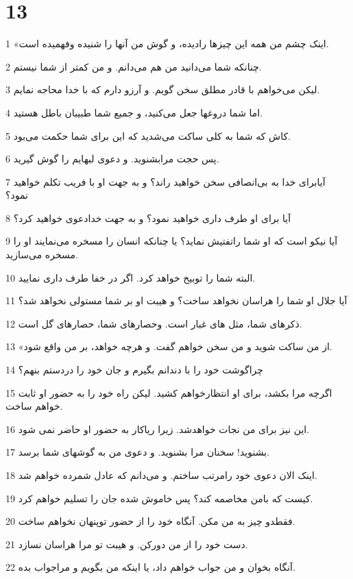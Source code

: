 \chapter{13}

\par 1 «اینک چشم من همه این چیزها رادیده، و گوش من آنها را شنیده وفهمیده است.
\par 2 چنانکه شما می‌دانید من هم می‌دانم. و من کمتر از شما نیستم.
\par 3 لیکن می‌خواهم با قادر مطلق سخن گویم. و آرزو دارم که با خدا محاجه نمایم.
\par 4 اما شما دروغها جعل می‌کنید، و جمیع شما طبیبان باطل هستید.
\par 5 کاش که شما به کلی ساکت می‌شدید که این برای شما حکمت می‌بود.
\par 6 پس حجت مرابشنوید. و دعوی لبهایم را گوش گیرید.
\par 7 آیابرای خدا به بی‌انصافی سخن خواهید راند؟ و به جهت او با فریب تکلم خواهید نمود؟
\par 8 آیا برای او طرف داری خواهید نمود؟ و به جهت خدادعوی خواهید کرد؟
\par 9 آیا نیکو است که او شما راتفتیش نماید؟ یا چنانکه انسان را مسخره می‌نمایند او را مسخره می‌سازید.
\par 10 البته شما را توبیخ خواهد کرد. اگر در خفا طرف داری نمایید.
\par 11 آیا جلال او شما را هراسان نخواهد ساخت؟ و هیبت او بر شما مستولی نخواهد شد؟
\par 12 ذکرهای شما، مثل های غبار است. وحصارهای شما، حصارهای گل است.
\par 13 «از من ساکت شوید و من سخن خواهم گفت. و هرچه خواهد، بر من واقع شود.
\par 14 چراگوشت خود را با دندانم بگیرم و جان خود را دردستم بنهم؟
\par 15 اگرچه مرا بکشد، برای او انتظارخواهم کشید. لیکن راه خود را به حضور او ثابت خواهم ساخت.
\par 16 این نیز برای من نجات خواهدشد. زیرا ریاکار به حضور او حاضر نمی شود.
\par 17 بشنوید! سخنان مرا بشنوید. و دعوی من به گوشهای شما برسد.
\par 18 اینک الان دعوی خود رامرتب ساختم. و می‌دانم که عادل شمرده خواهم شد.
\par 19 کیست که بامن مخاصمه کند؟ پس خاموش شده جان را تسلیم خواهم کرد.
\par 20 فقطدو چیز به من مکن. آنگاه خود را از حضور توپنهان نخواهم ساخت.
\par 21 دست خود را از من دورکن. و هیبت تو مرا هراسان نسازد.
\par 22 آنگاه بخوان و من جواب خواهم داد، یا اینکه من بگویم و مراجواب بده.
